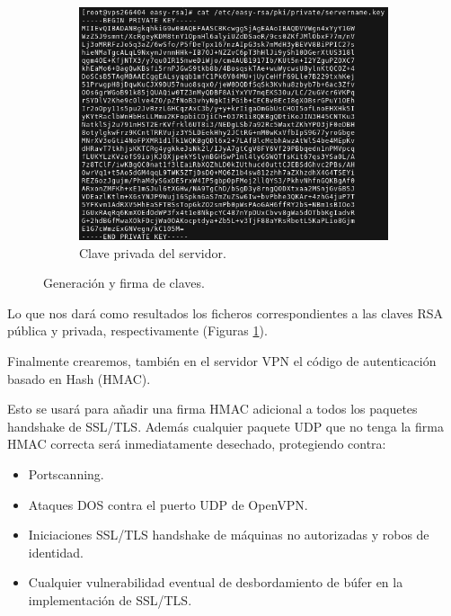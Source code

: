 \documentclass[a4paper, 11pt, titlepage]{article}
\begin{document}
\begin{figure}[htp]
                \begin{subfigure}[b]{0.7\linewidth}
                \includegraphics[width=1\textwidth]{resources/ca11.png}
                \caption{Clave privada del servidor.}
                \end{subfigure}
            \caption{Generación y firma de claves.}
            \label{fig:ca091011}
            \end{figure}
        
            Lo que nos dará como resultados los ficheros correspondientes a las claves RSA pública y privada,
            respectivamente (Figuras \ref{fig:ca091011}).
        
            \newpage
            Finalmente crearemos, también en el servidor VPN el código de autenticación basado en Hash (HMAC).
        
            Esto se usará para añadir una firma HMAC adicional a todos los paquetes handshake de SSL/TLS.
            Además cualquier paquete UDP que no tenga la firma HMAC correcta será inmediatamente desechado, 
            protegiendo contra:
        
            \begin{itemize}
                \item Portscanning.
                \item Ataques DOS contra el puerto UDP de OpenVPN.
                \item Iniciaciones SSL/TLS handshake de máquinas no autorizadas y robos de identidad.
                \item Cualquier vulnerabilidad eventual de desbordamiento de búfer en la implementación de SSL/TLS.
            \end{itemize}
        
\end{document}

